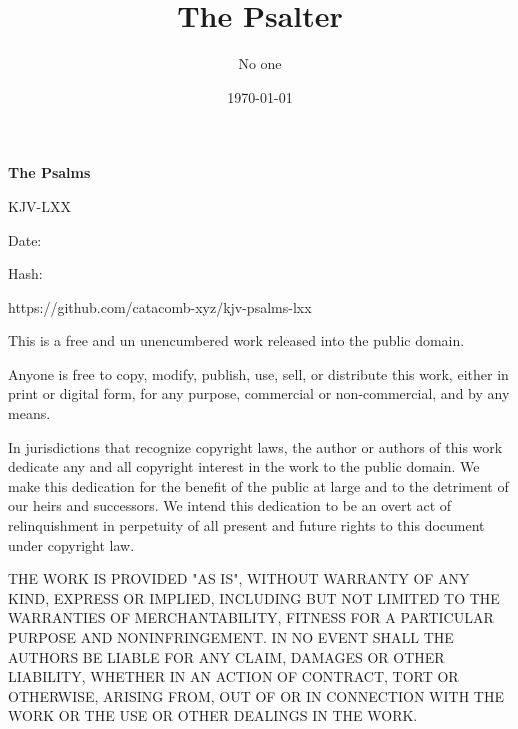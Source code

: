 \documentclass[12pt,openany]{book}
\title{The Psalter}
\author{No one}
\date{\today}
\begin{document}
\begin{titlepage}
  \begin{center}

  \begin{Huge}
  \textbf{The Psalms}
  \end{Huge}

  \vspace{2ex}

  KJV-LXX

  \vspace{3ex}

  \begin{footnotesize}
  Date: 

  Hash: 
  \end{footnotesize}

  \begin{tiny}
  https://github.com/catacomb-xyz/kjv-psalms-lxx
  \end{tiny}
  \end{center}

  \vspace{3ex}

  \begin{footnotesize}
  \noindent
  This is a free and un unencumbered work released into the public domain.
  \vspace{2ex}

  \noindent
  Anyone is free to copy, modify, publish, use, sell, or distribute this work, either in print or digital form, for any purpose, commercial or non-commercial, and by any means.
  \vspace{2ex}

  \noindent
  In jurisdictions that recognize copyright laws, the author or authors of this work dedicate any and all copyright interest in the work to the public domain. We make this dedication for the benefit of the public at large and to the detriment of our heirs and successors. We intend this dedication to be an overt act of relinquishment in perpetuity of all present and future rights to this document under copyright law.
  \vspace{2ex}

  \noindent
  THE WORK IS PROVIDED "AS IS", WITHOUT WARRANTY OF ANY KIND, EXPRESS OR IMPLIED, INCLUDING BUT NOT LIMITED TO THE WARRANTIES OF MERCHANTABILITY, FITNESS FOR A PARTICULAR PURPOSE AND NONINFRINGEMENT. IN NO EVENT SHALL THE AUTHORS BE LIABLE FOR ANY CLAIM, DAMAGES OR OTHER LIABILITY, WHETHER IN AN ACTION OF CONTRACT, TORT OR OTHERWISE, ARISING FROM, OUT OF OR IN CONNECTION WITH THE WORK OR THE USE OR OTHER DEALINGS IN THE WORK.
  \end{footnotesize}

  \vfill
\end{titlepage}

\newpage



\newpage

\thispagestyle{empty}
\ %

\newpage

\newpage
\pagestyle{plain}
\end{document}
